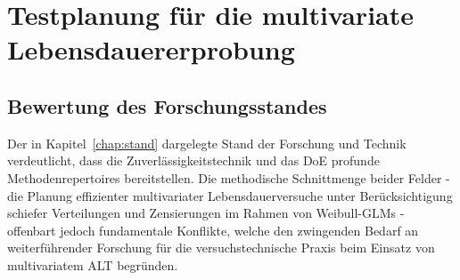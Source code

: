 \chapter{Testplanung für die multivariate Lebensdauererprobung} \label{chap:ansatz}

\section{Bewertung des Forschungsstandes} \label{sec:bewertung_stand}

Der in Kapitel~\ref{chap:stand} dargelegte Stand der Forschung und Technik verdeutlicht, dass die Zuverlässigkeitstechnik und das \ac{DoE} profunde Methodenrepertoires bereitstellen.
Die methodische Schnittmenge beider Felder - die Planung effizienter multivariater Lebensdauerversuche unter Berücksichtigung schiefer Verteilungen und Zensierungen im Rahmen von Weibull-\acp{GLM} - offenbart jedoch fundamentale Konflikte, welche den zwingenden Bedarf an weiterführender Forschung für die versuchstechnische Praxis beim Einsatz von multivariatem \ac{ALT} begründen.

